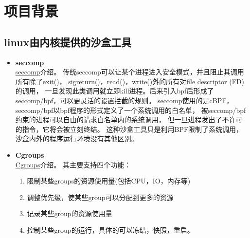 \documentclass[AutoFakeBold,a4paper]{ctexart}
\begin{document}
\section{项目背景}

\subsection{linux由内核提供的沙盒工具}
\begin{itemize}
    \item \textbf{seccomp}\\
    \href{https://en.wikipedia.org/wiki/Seccomp}{seccomp}介绍。
    传统seccomp可以让某个进程进入安全模式，并且阻止其调用所有除了exit()，
    sigreturn()，read()，write()外的所有对file descriptor (FD) 的调用，
    一旦发现此类调用就立即kill进程。后来引入bpf后形成了seccomp/bpf，可以更灵活的设置拦截的规则。
    seccomp使用的是cBPF\cite{calavera2019linux}，
    seccomp/bpf以bpf程序的形式定义了一个系统调用的白名单，
    被seccomp/bpf约束的进程可以自由的请求白名单内的系统调用，
    但一旦进程发出了不许可的指令，它将会被立刻终结。
    这种沙盒工具只是利用BPF限制了系统调用，沙盒内外的程序运行环境没有其他区别。
    \cite{2020SandboxLinux}

    \item \textbf{Cgroups}\\
    \href{https://en.wikipedia.org/wiki/Cgroups}{Cgroups}介绍。
    其主要支持四个功能：
    \begin{enumerate}
        \item 限制某些groups的资源使用量(包括CPU，IO，内存等)
        \item 调整优先级，使某些group可以分配到更多的资源
        \item 记录某些group的资源使用量
        \item 控制某些group的运行，具体的可以冻结，快照，重启。
    \end{enumerate}


\end{itemize}
\end{document}
